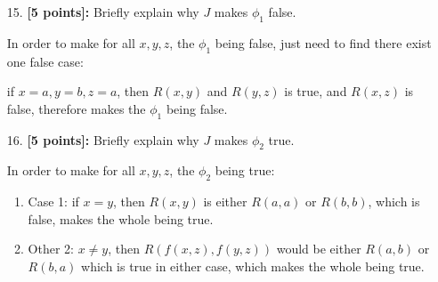 \documentclass{article}
\begin{document}
\begin{enumerate}
\item[15.] \textbf{[5 points]:} Briefly explain why $J$ makes $\phi_1$
  false.
  \begin{answer}
    In order to make for all $x, y, z$, the $\phi_1$ being false, just need to find 
    there exist one false case:
    
    if $x = a, y = b, z = a$, then $R(x,y)$ and $R(y,z)$ is true, and $R(x,z)$ is 
    false, therefore makes the $\phi_1$ being false.
  \end{answer}
\end{enumerate}

\begin{enumerate}
\item[16.] \textbf{[5 points]:} Briefly explain why $J$ makes $\phi_2$
  true.
  \begin{answer}
    In order to make for all $x, y, z$, the $\phi_2$ being true:
    \begin{enumerate}
      \item Case 1: if $x = y $, then $R(x,y)$ is either $R(a,a)$ or $R(b, b)$, 
      which is false, makes the whole being true.
      \item Other 2: $x \neq y $, then $R(f(x,z),f(y,z))$ would be either $R(a,b)$ 
      or $R(b, a)$ which is true in either case, which makes the whole being true.
    \end{enumerate}
  \end{answer}
\end{enumerate}
\end{document}
